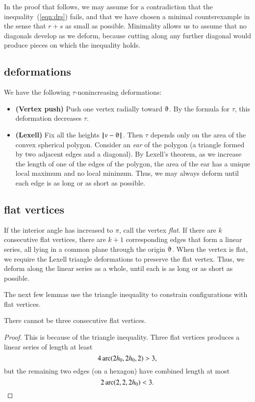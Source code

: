 In the proof that follows, we may assume for a contradiction that the
inequality~(\ref{eqn:drs}) fails, and that we have chosen a minimal counterexample in the sense that $r+s$ as small as possible.   Minimality allows us to assume that no diagonals develop as we deform, because cutting along any further diagonal would produce pieces on which the inequality holds.

\subsection{deformations}

We have the following $\tau$-nonincreasing deformations:
\begin{itemize}
\item {\bf (Vertex push)} Push one vertex radially toward $\orgn$.  By the formula for $\tau$, this deformation decreases $\tau$.
\item {\bf (Lexell)} Fix all the heights $\norm{v}{\orgn}$. Then $\tau$ depends only on the area of the convex spherical polygon.  Consider an {\it ear} of the polygon (a triangle formed by two adjacent edges and a diagonal).  By Lexell's theorem, as we increase the length of one of the edges of the polygon, the area of the ear has a unique local maximum and no local minimum.  Thus, we may always deform until each edge is as long or as short as possible.
\end{itemize}

\subsection{flat vertices}

If the interior angle has increased to $\pi$, call the vertex {\it flat}. If there are $k$ consecutive flat vertices, there are  $k+1$ corresponding edges that form a linear series, all lying in a common plane through the origin $\orgn$.  When the vertex is flat, we require the Lexell triangle deformations to preserve the flat vertex.  Thus, we deform along the linear series as a whole, until each is as long or as short as possible.  

The next few lemmas use the triangle inequality to constrain configurations with flat vertices.

\begin{lemma}
There cannot be three consecutive flat vertices.
\end{lemma}

\begin{proof} This is because of the triangle inequality.  Three flat vertices produces a linear series of length at least
$$
4\operatorname{arc}(2{h_0},2{h_0},2) > 3,
$$
but the remaining two edges (on a hexagon) have combined length at most
$$
2\operatorname{arc}(2,2,2{h_0}) < 3.
$$
\end{proof}


